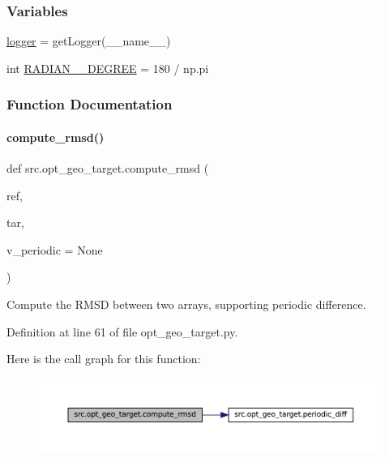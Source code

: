 \subsubsection*{Variables}
\begin{DoxyCompactItemize}
\item 
\hyperlink{namespacesrc_1_1opt__geo__target_a02a9cc0378ce93c64c05f75bfc9f8ef9}{logger} = get\+Logger(\+\_\+\+\_\+name\+\_\+\+\_\+)
\item 
int \hyperlink{namespacesrc_1_1opt__geo__target_a36da143de24751427dbce910c8af825e}{R\+A\+D\+I\+A\+N\+\_\+\_\+\+D\+E\+G\+R\+EE} = 180 / np.\+pi
\end{DoxyCompactItemize}


\subsubsection{Function Documentation}
\mbox{\label{namespacesrc_1_1opt__geo__target_a646aaa5ddda0042e6c9ea15077fe0504}} 
\paragraph{\texorpdfstring{compute\+\_\+rmsd()}{compute\_rmsd()}}
{\footnotesize\ttfamily def src.\+opt\+\_\+geo\+\_\+target.\+compute\+\_\+rmsd (\begin{DoxyParamCaption}\item[{}]{ref,  }\item[{}]{tar,  }\item[{}]{v\+\_\+periodic = {\ttfamily None} }\end{DoxyParamCaption})}



Compute the R\+M\+SD between two arrays, supporting periodic difference. 



Definition at line 61 of file opt\+\_\+geo\+\_\+target.\+py.

Here is the call graph for this function\+:
\nopagebreak
\begin{figure}[H]
\begin{center}
\leavevmode
\includegraphics[width=350pt]{namespacesrc_1_1opt__geo__target_a646aaa5ddda0042e6c9ea15077fe0504_cgraph}
\end{center}
\end{figure}
\mbox{\label{namespacesrc_1_1opt__geo__target_afbe357b3c6d344e4549b0cff5400e027}} 
